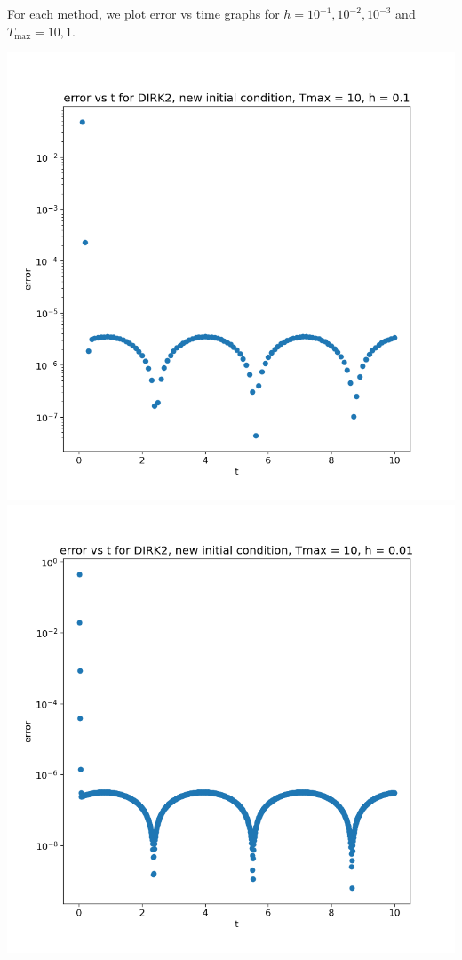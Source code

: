 \documentclass{article}
\begin{document}
\begin{enumerate}
\begin{enumerate}[label=(\alph*)]
	For each method, we plot error vs time graphs for $h=10^{-1},10^{-2},10^{-3}$ and $T_\text{max}=10,1$.
	
	\begin{center}
		\includegraphics[scale=.3]{hw3 dirk2 err vs t graph 1}
		\includegraphics[scale=.3]{hw3 dirk2 err vs t graph 2}

\end{center}
\end{enumerate}
\end{enumerate}
\end{document}
